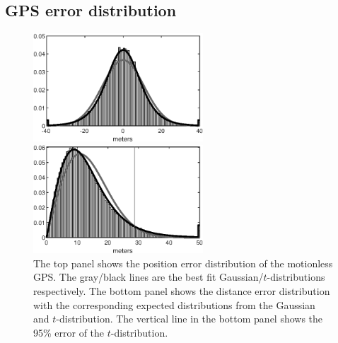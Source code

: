 \documentclass{ametsoc}
\begin{document}

%
\subsection{GPS error distribution}
\label{subsec:gps_position_errors}
%

\begin{figure}
  \centerline{\includegraphics[width=15pc,angle=0]{gps_error_distribution.eps}}
  \centerline{\includegraphics[width=15pc,angle=0]{gps_distance_error_distribution.eps}} 
  \caption{The top panel shows the position error distribution of the motionless GPS. The gray/black lines are the best fit Gaussian/$t$-distributions respectively. The bottom panel shows the distance error distribution with the corresponding expected distributions from the Gaussian and $t$-distribution. The vertical line in the bottom panel shows the 95\% error of the $t$-distribution.}
  \label{motionless_error}
\end{figure}
\end{document}
